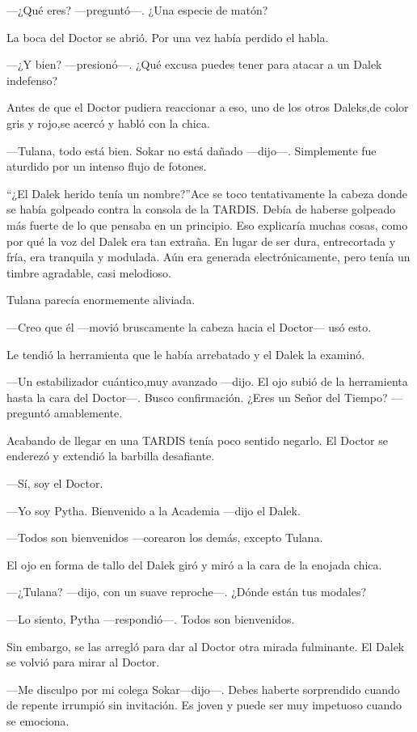 ---¿Qué eres? ---preguntó---. ¿Una especie de matón?

La boca del Doctor se abrió. Por una vez había perdido el habla.

---¿Y bien? ---presionó---. ¿Qué excusa puedes tener para atacar
a un Dalek indefenso?

Antes de que el Doctor pudiera reaccionar a eso, uno de los
otros Daleks,de color gris y rojo,se acercó y habló con la chica.

---Tulana, todo está bien. Sokar no está dañado ---dijo---.
Simplemente fue aturdido por un intenso flujo de fotones.

``¿El Dalek herido tenía un nombre?''Ace se toco tentativamente
la cabeza donde se había golpeado contra la consola de la TARDIS. Debía
de haberse golpeado más fuerte de lo que pensaba en un principio. Eso
explicaría muchas cosas, como por qué la voz del Dalek era tan extraña.
En lugar de ser dura, entrecortada y fría, era tranquila y modulada. Aún
era generada electrónicamente, pero tenía un timbre agradable, casi
melodioso.

Tulana parecía enormemente aliviada.

---Creo que él ---movió bruscamente la cabeza hacia el Doctor---
usó esto.

Le tendió la herramienta que le había arrebatado y el Dalek la
examinó.

---Un estabilizador cuántico,muy avanzado ---dijo. El ojo subió
de la herramienta hasta la cara del Doctor---. Busco confirmación. ¿Eres
un Señor del Tiempo? ---preguntó amablemente.

Acabando de llegar en una TARDIS tenía poco sentido negarlo. El
Doctor se enderezó y extendió la barbilla desafiante.

---Sí, soy el Doctor.

---Yo soy Pytha. Bienvenido a la Academia ---dijo el Dalek.

---Todos son bienvenidos ---corearon los demás, excepto Tulana.

El ojo en forma de tallo del Dalek giró y miró a la cara de la
enojada chica.

---¿Tulana? ---dijo, con un suave reproche---. ¿Dónde están tus
modales?

---Lo siento, Pytha ---respondió---. Todos son bienvenidos.

Sin embargo, se las arregló para dar al Doctor otra mirada
fulminante. El Dalek se volvió para mirar al Doctor.

---Me disculpo por mi colega Sokar---dijo---. Debes haberte
sorprendido cuando de repente irrumpió sin invitación. Es joven y puede
ser muy impetuoso cuando se emociona.

